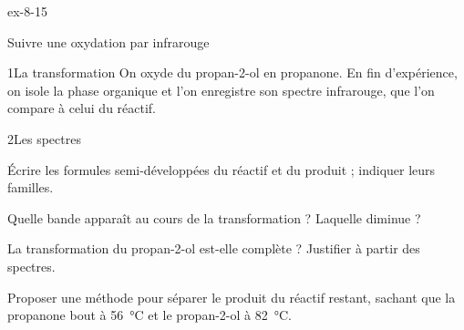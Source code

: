 \begin{blocLivre}{ex-8-15}
\begin{exercice}[3]{Suivre une oxydation par infrarouge}
\begin{docu}{1}{La transformation}
On oxyde du propan-2-ol en propanone. En fin d'expérience, on isole la phase organique et l'on enregistre son spectre
infrarouge, que l'on compare à celui du réactif.
\end{docu}
\begin{docu}{2}{Les spectres}
\end{docu}
\begin{questions}
\item Écrire les formules semi-développées du réactif et du produit ; indiquer leurs familles.
\item Quelle bande apparaît au cours de la transformation ? Laquelle diminue ?
\item \initiative La transformation du propan-2-ol est-elle complète ? Justifier à partir des spectres.
\item Proposer une méthode pour séparer le produit du réactif restant, sachant que la propanone bout à \qty{56}{\degreeCelsius} et le
propan-2-ol à \qty{82}{\degreeCelsius}.
\end{questions}
\end{exercice}
\end{blocLivre}
